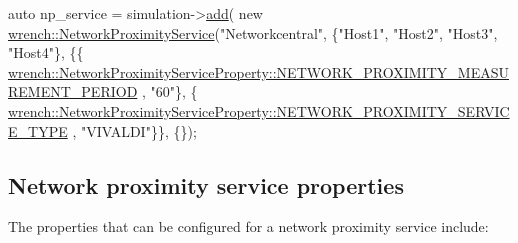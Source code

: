 \begin{DoxyCode}
\textcolor{keyword}{auto} np\_service = simulation->\hyperlink{classwrench_1_1_simulation_ad1f5c12285ecfaf5a2ce7dab5ec8b4c5}{add}(
          \textcolor{keyword}{new} \hyperlink{classwrench_1_1_network_proximity_service}{wrench::NetworkProximityService}(\textcolor{stringliteral}{"Networkcentral"}, 
                                       \{\textcolor{stringliteral}{"Host1"}, \textcolor{stringliteral}{"Host2"}, \textcolor{stringliteral}{"Host3"}, \textcolor{stringliteral}{"Host4"}\},
                                       \{\{
      \hyperlink{classwrench_1_1_network_proximity_service_property_ae186f459f35a78e808d406f74483e418}{wrench::NetworkProximityServiceProperty::NETWORK\_PROXIMITY\_MEASUREMENT\_PERIOD}
      , \textcolor{stringliteral}{"60"}\},
                                        \{
      \hyperlink{classwrench_1_1_network_proximity_service_property_a4cb766dcd609012ab68000cfd9dc11b1}{wrench::NetworkProximityServiceProperty::NETWORK\_PROXIMITY\_SERVICE\_TYPE}
      , \textcolor{stringliteral}{"VIVALDI"}\}\},
                                       \{\});
\end{DoxyCode}
\hypertarget{guide-networkproximity_guide-networkproximity-creating-properties}{}\subsection{Network proximity service properties}\label{guide-networkproximity_guide-networkproximity-creating-properties}
The properties that can be configured for a network proximity service include\+:


